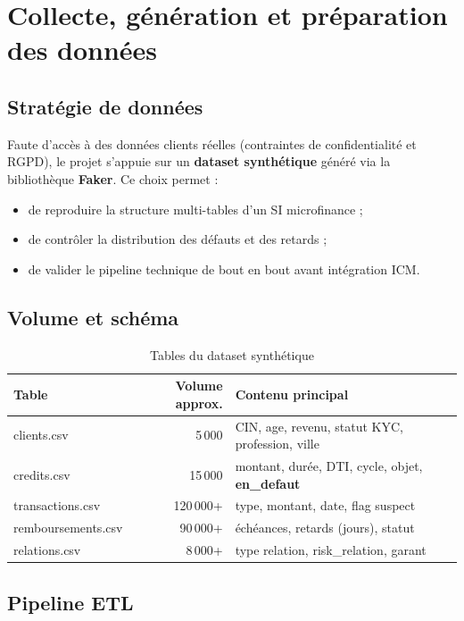 \chapter{Collecte, génération et préparation des données}
\label{ch:donnees}

\section{Stratégie de données}

Faute d'accès à des données clients réelles (contraintes de confidentialité et RGPD), le projet s'appuie sur un \textbf{dataset synthétique} généré via la bibliothèque \textbf{Faker}. Ce choix permet :
\begin{itemize}[leftmargin=*]
  \item de reproduire la structure multi-tables d'un SI microfinance ;
  \item de contrôler la distribution des défauts et des retards ;
  \item de valider le pipeline technique de bout en bout avant intégration ICM.
\end{itemize}

\section{Volume et schéma}

\begin{table}[H]
  \centering
  \caption{Tables du dataset synthétique}
  \begin{tabular}{|l|r|p{7cm}|}
    \hline
    \textbf{Table} & \textbf{Volume approx.} & \textbf{Contenu principal} \\
    \hline
    clients.csv & 5\,000 & CIN, age, revenu, statut KYC, profession, ville \\
    \hline
    credits.csv & 15\,000 & montant, durée, DTI, cycle, objet, \textbf{en\_defaut} \\
    \hline
    transactions.csv & 120\,000+ & type, montant, date, flag suspect \\
    \hline
    remboursements.csv & 90\,000+ & échéances, retards (jours), statut \\
    \hline
    relations.csv & 8\,000+ & type relation, risk\_relation, garant \\
    \hline
  \end{tabular}
\end{table}

\section{Pipeline ETL}

